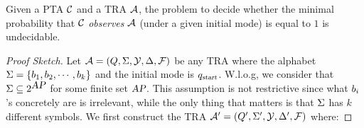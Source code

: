%
\begin{theorem}\label{thm:traundecidability}
Given a PTA $\mathcal{C}$ and a TRA $\mathcal{A}$, the problem to decide whether the minimal probability
that $\mathcal{C}$ \emph{observes} $\mathcal{A}$ (under a given initial mode) is equal to $1$ is undecidable.
\end{theorem}
%
\begin{proof}[Proof Sketch]
Let $\mathcal{A}=(Q,\Sigma,\mathcal{Y},\Delta,\mathcal{F})$ be any TRA where the alphabet $\Sigma = \{b_{1}, b_{2}, \cdots, b_{k}\}$ and the initial mode is $q_{\mbox{\sl\scriptsize start}}$.
W.l.o.g, we consider that $\Sigma\subseteq 2^{\mbox{\sl AP}}$ for some finite set $\mbox{\sl AP}$.
This assumption is not restrictive since what $b_{i}$'s concretely are is irrelevant, while the only thing that matters is that $\Sigma$ has $k$ different symbols.
We first construct the TRA $\mathcal{A}' = (Q', \Sigma', \mathcal{Y}, \Delta',\mathcal{F})$ where:


\end{proof}
